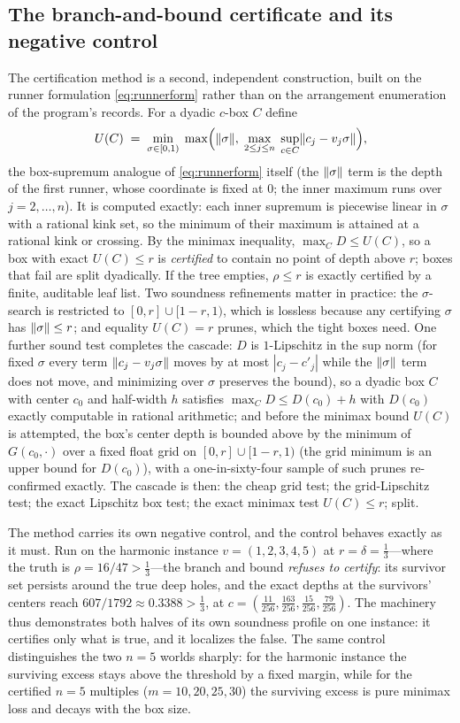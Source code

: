 \subsection{The branch-and-bound certificate and its negative control}
\label{sec:bb}

The certification method is a second, independent construction, built on
the runner formulation \eqref{eq:runnerform} rather than on the
arrangement enumeration of the program's records. For a dyadic $c$-box
$C$ define
\[
U(C)\;=\;\min_{\sigma\in[0,1)}\;
\max\Bigl(\lVert \sigma \rVert,\;\max_{2\le j\le n}\;
\sup_{c\in C}\lVert c_j-v_j\sigma \rVert\Bigr),
\]
the box-supremum analogue of \eqref{eq:runnerform} itself (the
$\lVert \sigma \rVert$ term is the depth of the first runner, whose coordinate is
fixed at $0$; the inner maximum runs over $j=2,\dots,n$). It is
computed exactly: each inner supremum is piecewise linear in $\sigma$
with a rational kink set, so the minimum of their maximum is attained at
a rational kink or crossing. By the minimax inequality,
$\max_C D\le U(C)$, so a box with exact $U(C)\le r$ is \emph{certified}
to contain no point of depth above $r$; boxes that fail are split
dyadically. If the tree empties, $\rho\le r$ is exactly certified by a
finite, auditable leaf list. Two soundness refinements matter in
practice: the $\sigma$-search is restricted to $[0,r]\cup[1-r,1)$, which
is lossless because any certifying $\sigma$ has $\lVert \sigma \rVert\le r$; and
equality $U(C)=r$ prunes, which the tight boxes need. One further
sound test completes the cascade: $D$ is $1$-Lipschitz in the sup norm
(for fixed $\sigma$ every term $\lVert c_j-v_j\sigma \rVert$ moves by at most
$|c_j-c'_j|$ while the $\lVert \sigma \rVert$ term does not move, and minimizing
over $\sigma$ preserves the bound), so a dyadic box $C$ with center
$c_0$ and half-width $h$ satisfies $\max_C D\le D(c_0)+h$ with $D(c_0)$
exactly computable in rational arithmetic; and before the minimax bound
$U(C)$ is attempted, the box's center depth is bounded above by the
minimum of $G(c_0,\cdot)$ over a fixed float grid on
$[0,r]\cup[1-r,1)$ (the grid minimum is an upper bound for $D(c_0)$),
with a one-in-sixty-four sample of such prunes re-confirmed exactly.
The cascade is then: the cheap grid test; the grid-Lipschitz test; the
exact Lipschitz box test; the exact minimax test $U(C)\le r$; split.

The method carries its own negative control, and the control behaves
exactly as it must. Run on the harmonic instance $v=(1,2,3,4,5)$ at
$r=\delta=\tfrac13$---where the truth is $\rho=16/47>\tfrac13$---the
branch and bound \emph{refuses to certify}: its survivor set persists
around the true deep holes, and the exact depths at the survivors'
centers reach $607/1792\approx0.3388>\tfrac13$, at
$c=(\tfrac{11}{256},\tfrac{163}{256},\tfrac{15}{256},\tfrac{79}{256})$.
The machinery thus demonstrates both halves of its own soundness profile
on one instance: it certifies only what is true, and it localizes the
false. The same control distinguishes the two $n=5$ worlds sharply: for
the harmonic instance the surviving excess stays above the threshold by
a fixed margin, while for the certified $n=5$ multiples
($m=10,20,25,30$) the surviving excess is pure minimax loss and decays
with the box size.

